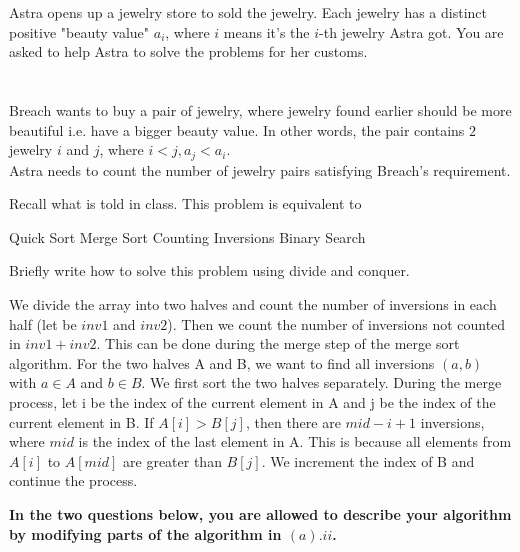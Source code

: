 
Astra opens up a jewelry store to sold the jewelry. Each jewelry has a distinct positive "beauty value" $a_i$, where $i$ means it's the $i$-th jewelry Astra got. You are asked to help Astra to solve the problems for her customs.

\begin{parts}
\part{} 

Breach wants to buy a pair of jewelry, where jewelry found earlier should be more beautiful i.e. have a bigger beauty value. In other words, the pair contains $2$ jewelry $i$ and $j$, where $i<j,a_j<a_i$. \\
Astra needs to count the number of jewelry pairs satisfying Breach's requirement.

\begin{subparts}
    \subpart[1] Recall what is told in class. This problem is equivalent to \\
    \begin{oneparcheckboxes}
        \choice Quick Sort
        \choice Merge Sort
        \CorrectChoice Counting Inversions
        \choice Binary Search
    \end{oneparcheckboxes}
    \subpart[2] Briefly write how to solve this problem using divide and conquer.
\begin{solution}
    We divide the array into two halves and count the number of inversions in each half (let be $inv1$ and $inv2$). Then we count the number of inversions not counted in $inv1 + inv2$. This can be done during the merge step of the merge sort algorithm.
    For the two halves A and B, we want to find all inversions $(a,b)$ with $a \in A$ and $b \in B$. We first sort the two halves separately. During the merge process, let i be the index of the current element in A and j be the index of the current element in B. If $A[i] > B[j]$, then there are $mid - i + 1$ inversions, where $mid$ is the index of the last element in A. This is because all elements from $A[i]$ to $A[mid]$ are greater than $B[j]$. We increment the index of B and continue the process.
\end{solution}
\end{subparts}
\newpage
\noindent \textbf{In the two questions below, you are allowed to describe your algorithm by modifying parts of the algorithm in $(a).ii$. 
} 
\part{}


\end{parts}
